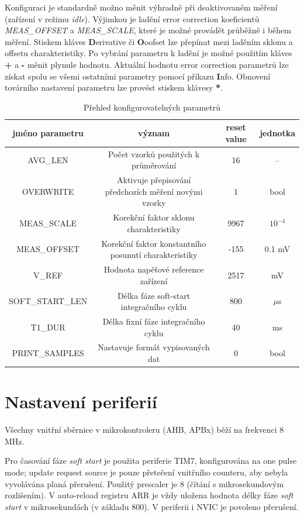 \documentclass[twoside]{article}
\begin{document}
Konfiguraci je standardně možno měnit výhradně při deaktivovaném měření (zařízení v režimu \textit{idle}).
Výjimkou je ladění error correction koeficientů \textit{MEAS\_OFFSET} a \textit{MEAS\_SCALE}, které je možné
provádět průběžně i během měření. Stiskem kláves \textbf{D}erivative či \textbf{O}oofset lze přepínat mezi laděním sklonu a offsetu charakteristiky.
Po vybrání parametru k ladění je možné použitím kláves \textbf{+} a \textbf{-} měnit plynule hodnotu.
Aktuální hodnotu error correction parametrů lze získat spolu se všemi ostatními parametry pomocí příkazu \textbf{I}nfo.
Obnovení továrního nastavení parametru lze provést stiskem klávesy \textbf{*}.


\begin{table}[htbp]
    \centering
    \begin{tabular}{c|c|c|c}
        \textbf{jméno parametru} & \textbf{význam} & \textbf{reset value} & \textbf{jednotka} \\ \hline
        AVG\_LEN & Počet vzorků použitých k průměrování & 16 & -- \\
        OVERWRITE & Aktivuje přepisování předchozích měření novými vzorky & 1 & bool \\
        MEAS\_SCALE & Korekční faktor sklonu charakteristiky & 9967 & $10^{-4}$ \\
        MEAS\_OFFSET & Korekční faktor konstantního posunutí charakteristiky & -155 & 0.1 mV \\
        V\_REF & Hodnota napěťové reference zařízení & 2517 & mV \\
        SOFT\_START\_LEN & Délka fáze soft-start integračního cyklu & 800 & $\mu$s \\
        T1\_DUR & Délka fixní fáze integračního cyklu & 40 & ms \\
        PRINT\_SAMPLES & Nastavuje formát vypisovaných dat & 0 & bool
    \end{tabular}
    \caption{Přehled konfigurovatelných parametrů}
    \label{tab:config}
\end{table}


\section{Nastavení periferií}

Všechny vnitřní sběrnice v mikrokontroleru (AHB, APBx) běží na frekvenci 8 MHz.

Pro časování fáze \textit{soft start} je použita periferie TIM7, konfigurována na one pulse mode; update request source
je pouze přetečení vnitřního counteru, aby nebyla vyvolávána planá přerušení. Použitý prescaler je 8 (čítání s mikrosekundovým rozlišením).
V auto-reload registru ARR je vždy uložena hodnota délky fáze \textit{soft start} v mikrosekundách (v základu 800). V periferii i NVIC je povoleno přerušení.
\end{document}

